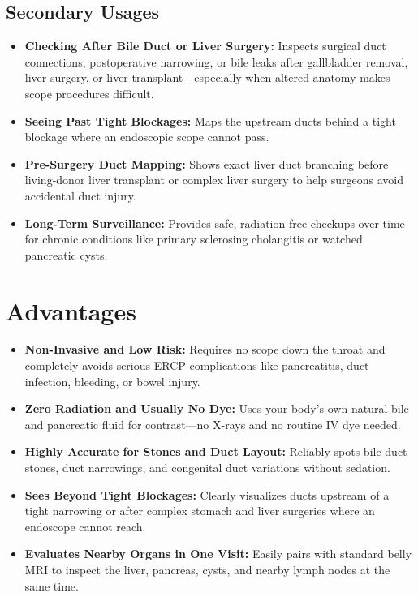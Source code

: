 \subsection{Secondary Usages}
\begin{itemize}
\item \textbf{Checking After Bile Duct or Liver Surgery:} Inspects surgical duct connections, postoperative narrowing, or bile leaks after gallbladder removal, liver surgery, or liver transplant---especially when altered anatomy makes scope procedures difficult.
\item \textbf{Seeing Past Tight Blockages:} Maps the upstream ducts behind a tight blockage where an endoscopic scope cannot pass.
\item \textbf{Pre-Surgery Duct Mapping:} Shows exact liver duct branching before living-donor liver transplant or complex liver surgery to help surgeons avoid accidental duct injury.
\item \textbf{Long-Term Surveillance:} Provides safe, radiation-free checkups over time for chronic conditions like primary sclerosing cholangitis or watched pancreatic cysts.
\end{itemize}

\section{Advantages}
\begin{itemize}
\item \textbf{Non-Invasive and Low Risk:} Requires no scope down the throat and completely avoids serious ERCP complications like pancreatitis, duct infection, bleeding, or bowel injury.
\item \textbf{Zero Radiation and Usually No Dye:} Uses your body's own natural bile and pancreatic fluid for contrast---no X-rays and no routine IV dye needed.
\item \textbf{Highly Accurate for Stones and Duct Layout:} Reliably spots bile duct stones, duct narrowings, and congenital duct variations without sedation.
\item \textbf{Sees Beyond Tight Blockages:} Clearly visualizes ducts upstream of a tight narrowing or after complex stomach and liver surgeries where an endoscope cannot reach.
\item \textbf{Evaluates Nearby Organs in One Visit:} Easily pairs with standard belly MRI to inspect the liver, pancreas, cysts, and nearby lymph nodes at the same time.
\end{itemize}

